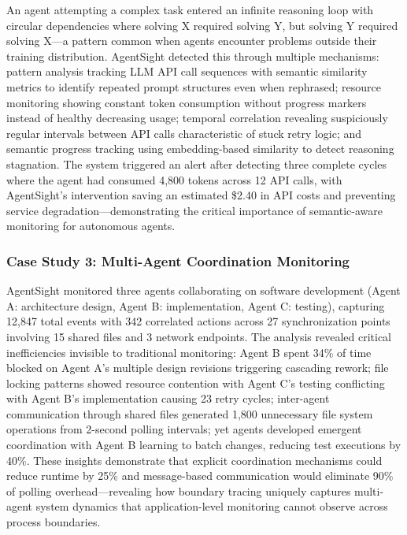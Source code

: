 An agent attempting a complex task entered an infinite reasoning loop with circular dependencies where solving X required solving Y, but solving Y required solving X—a pattern common when agents encounter problems outside their training distribution. AgentSight detected this through multiple mechanisms: pattern analysis tracking LLM API call sequences with semantic similarity metrics to identify repeated prompt structures even when rephrased; resource monitoring showing constant token consumption without progress markers instead of healthy decreasing usage; temporal correlation revealing suspiciously regular intervals between API calls characteristic of stuck retry logic; and semantic progress tracking using embedding-based similarity to detect reasoning stagnation. The system triggered an alert after detecting three complete cycles where the agent had consumed 4,800 tokens across 12 API calls, with AgentSight's intervention saving an estimated \$2.40 in API costs and preventing service degradation—demonstrating the critical importance of semantic-aware monitoring for autonomous agents.

\subsubsection{Case Study 3: Multi-Agent Coordination Monitoring}

AgentSight monitored three agents collaborating on software development (Agent A: architecture design, Agent B: implementation, Agent C: testing), capturing 12,847 total events with 342 correlated actions across 27 synchronization points involving 15 shared files and 3 network endpoints. The analysis revealed critical inefficiencies invisible to traditional monitoring: Agent B spent 34\% of time blocked on Agent A's multiple design revisions triggering cascading rework; file locking patterns showed resource contention with Agent C's testing conflicting with Agent B's implementation causing 23 retry cycles; inter-agent communication through shared files generated 1,800 unnecessary file system operations from 2-second polling intervals; yet agents developed emergent coordination with Agent B learning to batch changes, reducing test executions by 40\%. These insights demonstrate that explicit coordination mechanisms could reduce runtime by 25\% and message-based communication would eliminate 90\% of polling overhead—revealing how boundary tracing uniquely captures multi-agent system dynamics that application-level monitoring cannot observe across process boundaries.



